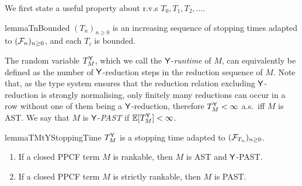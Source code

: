 We first state a useful property about r.v.s $T_0, T_1, T_2, \dots$.
\begin{restatable}{lemma}{TnBounded}
\label{lem:TnBounded}
$(T_n)_{n \geq 0}$ is an increasing sequence of stopping times adapted to $(\mathcal{F}_n)_{n \geq 0}$, and each $T_i$ is bounded.
\end{restatable}



The random variable $T_M^{\mathsf{Y}}$, which we call the $\mathsf{Y}$-\emph{runtime} of $M$, can equivalently be defined as the number of $\mathsf{Y}$-reduction steps in the reduction sequence of $M$. 
Note that, as the type system ensures that the reduction relation excluding $\mathsf{Y}$-reduction is strongly normalising, only finitely many reductions can occur in a row without one of them being a $\mathsf{Y}$-reduction, therefore $T_M^{\mathsf{Y}} < \infty$ a.s.~iff $M$ is AST. 
We say that $M$ is $\mathsf{Y}$-\emph{PAST} if $\mathbb{E}[T^{\mathsf{Y}}_M] < \infty$.

\begin{restatable}{lemma}{TMtYStoppingTime}
\label{lem:TMtY is a stopping time}
$T_M^{\mathsf{Y}}$ is a stopping time adapted to $(\mathcal{F}_{T_n})_{n \geq 0}$.
\end{restatable}

\begin{therm} \label{thm:rankable implies termination}
\begin{enumerate}
\item If a closed PPCF term $M$ is rankable, then $M$ is AST and $\mathsf{Y}$-PAST.

\item If a closed PPCF term $M$ is strictly rankable, then $M$ is PAST.
\end{enumerate}
\end{therm}


